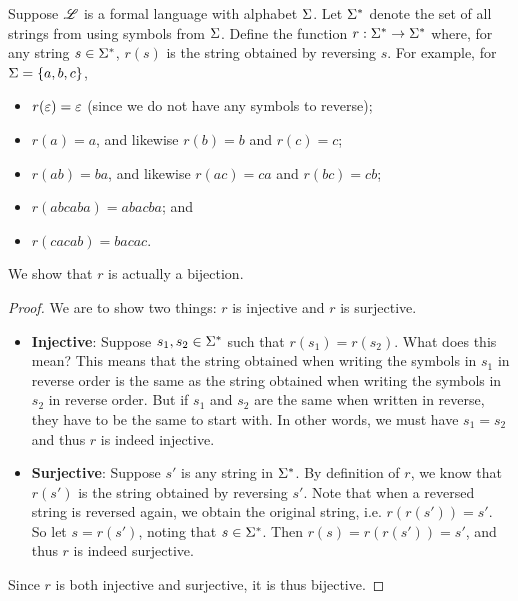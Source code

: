 \begin{example}\label{example:string-reversal-function}
    Suppose $\mathscr{L}$ is a formal language with alphabet $\Sigma$. Let $\Sigma^\ast$ denote the set of all strings from using symbols from $\Sigma$. Define the function $r: \Sigma^\ast \to \Sigma^\ast$ where, for any string $s \in \Sigma^\ast$, $r(s)$ is the string obtained by reversing $s$. For example, for $\Sigma = \{a,b,c\}$,
    \begin{itemize}
        \item $r(\varepsilon) = \varepsilon$ (since we do not have any symbols to reverse);
        \item $r(a) = a$, and likewise $r(b) = b$ and $r(c) = c$;
        \item $r(ab) = ba$, and likewise $r(ac) = ca$ and $r(bc) = cb$;
        \item $r(abcaba) = abacba$; and
        \item $r(cacab) = bacac$.
    \end{itemize}

    We show that $r$ is actually a bijection.
    \begin{proof}
        We are to show two things: $r$ is injective and $r$ is surjective.
        \begin{itemize}
            \item \textbf{Injective}: Suppose $s_1, s_2 \in \Sigma^\ast$ such that $r(s_1) = r(s_2)$. What does this mean? This means that the string obtained when writing the symbols in $s_1$ in reverse order is the same as the string obtained when writing the symbols in $s_2$ in reverse order. But if $s_1$ and $s_2$ are the same when written in reverse, they have to be the same to start with. In other words, we must have $s_1 = s_2$ and thus $r$ is indeed injective.
            \item \textbf{Surjective}: Suppose $s'$ is any string in $\Sigma^\ast$. By definition of $r$, we know that $r(s')$ is the string obtained by reversing $s'$. Note that when a reversed string is reversed again, we obtain the original string, i.e. $r(r(s')) = s'$. So let $s = r(s')$, noting that $s \in \Sigma^\ast$. Then $r(s) = r(r(s')) = s'$, and thus $r$ is indeed surjective.
        \end{itemize}
        Since $r$ is both injective and surjective, it is thus bijective.
    \end{proof}
\end{example}

